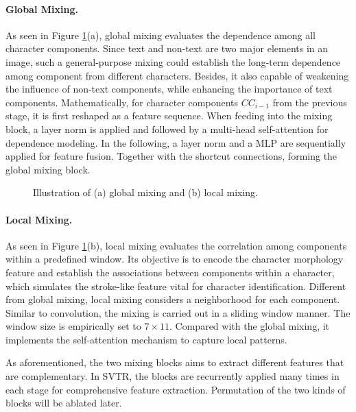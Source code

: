 \documentclass{article}
\begin{document}
\paragraph{Global Mixing.}As seen in Figure \ref{fig:globallocal}(a), global mixing evaluates the dependence among all character components. Since text and non-text are two major elements in an image, such a general-purpose mixing could establish the long-term dependence among component from different characters. Besides, it also capable of weakening the influence of non-text components, while enhancing the importance of text components. Mathematically, for character components $CC_{i-1}$ from the previous stage, it is first reshaped as a feature sequence. When feeding into the mixing block, a layer norm is applied and followed by a multi-head self-attention for dependence modeling. In the following, a layer norm and a MLP are sequentially applied for feature fusion. Together with the shortcut connections, forming the global mixing block.


\begin{figure}[t]
	\centering  \subfigbottomskip=2pt \subfigcapskip=-1pt 
\caption{Illustration of (a) global mixing and (b) local mixing.} \label{fig:globallocal}  \end{figure}


\paragraph{Local Mixing.}As seen in Figure \ref{fig:globallocal}(b), local mixing evaluates the correlation among components within a predefined window. Its objective is to encode the character morphology feature and establish the associations between components within a character, which simulates the stroke-like feature vital for character identification. Different from global mixing, local mixing considers a neighborhood for each component. Similar to convolution, the mixing is carried out in a sliding window manner. The window size is empirically set to $7 \times 11$. Compared with the global mixing, it implements the self-attention mechanism to capture local patterns.


As aforementioned, the two mixing blocks aims to extract different features that are complementary. In SVTR, the blocks are recurrently applied many times in each stage for comprehensive feature extraction. Permutation of the two kinds of blocks will be ablated later.
\end{document}
